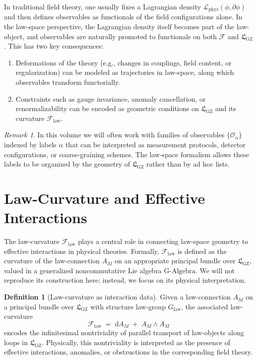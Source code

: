 \documentclass[11pt]{book}
\newcommand{\GAlgebra}{\text{G-Algebra}}
\newcommand{\GZLS}{\ensuremath{\mathfrak{L}_{\mathrm{GZ}}}}
\newcommand{\GZLOC}{\ensuremath{A_M}}
\newcommand{\GZLCurv}{\ensuremath{\mathcal{F}_{\mathrm{law}}}}
\theoremstyle{plain}
\theoremstyle{definition}
\newtheorem{definition}[theorem]{Definition}
\theoremstyle{remark}
\newtheorem{remark}[theorem]{Remark}
\begin{document}
In traditional field theory, one usually fixes a Lagrangian density
$\mathcal{L}_{\mathrm{phys}}(\phi,\partial\phi)$ and then defines
observables as functionals of the field configurations alone. In the
law-space perspective, the Lagrangian density itself becomes part of
the law-object, and observables are naturally promoted to functionals
on both $\mathcal{F}$ and $\GZLS$. This has two key consequences:

\begin{enumerate}
  \item Deformations of the theory (e.g., changes in couplings, field
        content, or regularization) can be modeled as trajectories in
        law-space, along which observables transform functorially.
  \item Constraints such as gauge invariance, anomaly cancellation,
        or renormalizability can be encoded as geometric conditions
        on $\GZLS$ and its curvature $\GZLCurv$.
\end{enumerate}

\begin{remark}
  In this volume we will often work with families of observables
  $\{\mathcal{O}_\alpha\}$ indexed by labels $\alpha$ that can be
  interpreted as measurement protocols, detector configurations,
  or coarse-graining schemes. The law-space formalism allows these
  labels to be organized by the geometry of $\GZLS$ rather than by
  ad hoc lists.
\end{remark}

\section{Law-Curvature and Effective Interactions}
\label{sec:law-curv-interactions}



The law-curvature $\GZLCurv$ plays a central role in connecting
law-space geometry to effective interactions in physical theories.
Formally, $\GZLCurv$ is defined as the curvature of the law-connection
$\GZLOC$ on an appropriate principal bundle over $\GZLS$, valued in
a generalized noncommutative Lie algebra $\GAlgebra$. We will not
reproduce its construction here; instead, we focus on its physical
interpretation.

\begin{definition}[Law-curvature as interaction data]
  Given a law-connection $\GZLOC$ on a principal bundle over
  $\GZLS$ with structure law-group $G_{\mathrm{law}}$, the
  associated law-curvature
  \[
      \GZLCurv \;=\; \mathrm{d}\GZLOC \;+\; \GZLOC \wedge \GZLOC
  \]
  encodes the infinitesimal nontriviality of parallel transport of
  law-objects along loops in $\GZLS$. Physically, this nontriviality
  is interpreted as the presence of effective interactions, anomalies,
  or obstructions in the corresponding field theory.
\end{definition}
\end{document}
